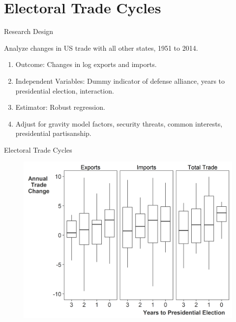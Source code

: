 \documentclass[12pt]{beamer}
\begin{document}


\section{Electoral Trade Cycles} 


\begin{frame}{Research Design}

\pause
Analyze changes in US trade with all other states, 1951 to 2014. 
\pause
\begin{enumerate}
\item Outcome: Changes in log exports and imports.
\pause
\item Independent Variables: Dummy indicator of defense alliance, years to presidential election, interaction. 
\pause 
\item Estimator: Robust regression. 
\pause 
\item Adjust for gravity model factors, security threats, common interests, presidential partisanship.
\end{enumerate} 

\end{frame} 


\begin{frame}{Electoral Trade Cycles}

\begin{figure}[htbp]
	\centering
		\includegraphics[height=.9\textheight]{us-trade-cycles.png}
\end{figure}


\end{frame} 
\end{document}
